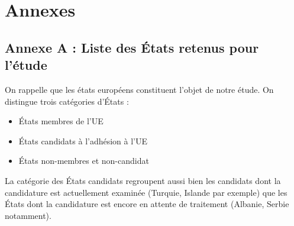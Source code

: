 \vfill
\pagebreak
\section{Annexes}
\subsection*{Annexe A : Liste des États retenus pour l'étude}

On rappelle que les états européens constituent l'objet de notre étude. On
distingue trois catégories d'États : 
\begin{itemize}
\item États membres de l'UE
\item États candidats à l'adhésion à l'UE
\item États non-membres et non-candidat
\end{itemize}

\vskip 6pt

La catégorie des États candidats regroupent aussi bien les candidats dont
la candidature est actuellement examinée (Turquie, Islande par exemple) que
les États dont la candidature est encore en attente de traitement (Albanie,
Serbie notamment).

